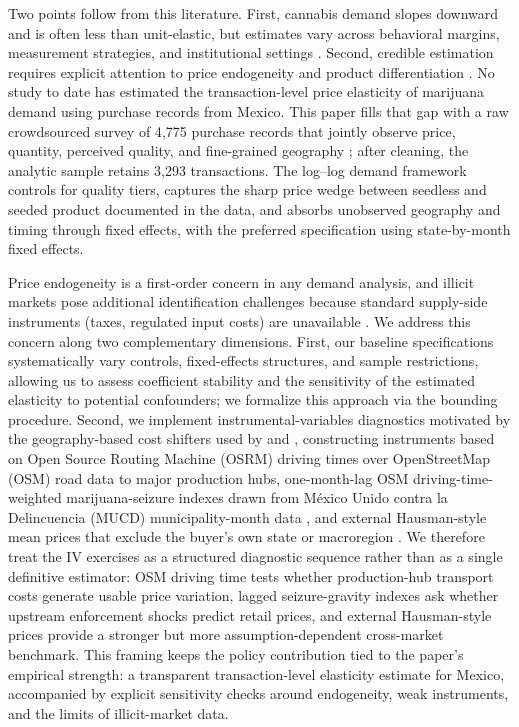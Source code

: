 Two points follow from this literature.  First, cannabis demand slopes downward and is often less than unit-elastic, but estimates vary across behavioral margins, measurement strategies, and institutional settings \citep{gallet2014monkey}.  Second, credible estimation requires explicit attention to price endogeneity and product differentiation \citep{davis2016crowd,halcoussis2017geo,riley2020southafrica,benlakhdar2016potency}.  No study to date has estimated the transaction-level price elasticity of marijuana demand using purchase records from Mexico.  This paper fills that gap with a raw crowdsourced survey of 4{,}775 purchase records that jointly observe price, quantity, perceived quality, and fine-grained geography \citep{bejaranoromero2020dataset}; after cleaning, the analytic sample retains 3{,}293 transactions.  The log--log demand framework controls for quality tiers, captures the sharp price wedge between seedless and seeded product documented in the data, and absorbs unobserved geography and timing through fixed effects, with the preferred specification using state-by-month fixed effects.

Price endogeneity is a first-order concern in any demand analysis, and illicit markets pose additional identification challenges because standard supply-side instruments (taxes, regulated input costs) are unavailable \citep{han2025commercialization,dodd2025canada}.  We address this concern along two complementary dimensions.  First, our baseline specifications systematically vary controls, fixed-effects structures, and sample restrictions, allowing us to assess coefficient stability and the sensitivity of the estimated elasticity to potential confounders; we formalize this approach via the \citet{oster2019unobservable} bounding procedure.  Second, we implement instrumental-variables diagnostics motivated by the geography-based cost shifters used by \citet{davis2016crowd} and \citet{halcoussis2017geo}, constructing instruments based on Open Source Routing Machine (OSRM) driving times over OpenStreetMap (OSM) road data to major production hubs, one-month-lag OSM driving-time-weighted marijuana-seizure indexes drawn from M\'{e}xico Unido contra la Delincuencia (MUCD) municipality-month data \citep{openstreetmap2026,luxen2011osrm,mucd2019seizures}, and external Hausman-style mean prices that exclude the buyer's own state or macroregion \citep{hausman1994competitive,nevo2001cereal}.  We therefore treat the IV exercises as a structured diagnostic sequence rather than as a single definitive estimator: OSM driving time tests whether production-hub transport costs generate usable price variation, lagged seizure-gravity indexes ask whether upstream enforcement shocks predict retail prices, and external Hausman-style prices provide a stronger but more assumption-dependent cross-market benchmark.  This framing keeps the policy contribution tied to the paper's empirical strength: a transparent transaction-level elasticity estimate for Mexico, accompanied by explicit sensitivity checks around endogeneity, weak instruments, and the limits of illicit-market data.
